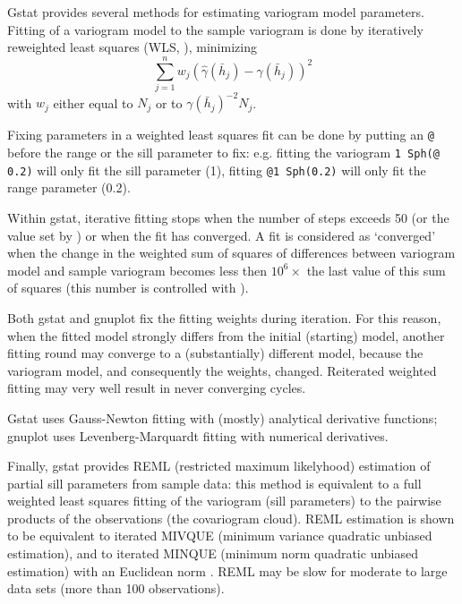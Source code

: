\documentclass[a4paper,12pt]{book}
\renewcommand{\cite}{\citet}
\newcommand{\code}[1]{\texttt{#1}}
\newcommand{\iskey}[1]{\htmlref{\code{{#1}}}{key:#1}}
\newcommand{\isXkey}[2]{\htmlref{\code{{#1}}}{key:#2}}
\begin{document}
Gstat provides several methods for estimating variogram model
parameters. Fitting of a variogram model to the sample variogram is
done by iteratively reweighted least squares (WLS, \cite{cressie93}),
minimizing
$$
\sum_{j=1}^{n} 
w_j ( \hat \gamma (\bar{h}_j ) - \gamma(\bar{h}_j))^2
$$
with $w_j$ either equal to $N_j$ or to $\gamma(\bar{h}_j)^{-2}N_j$.

Fixing parameters in a weighted least squares fit can be done by putting
an {\tt @} before the range or the sill parameter to fix: e.g. fitting the
variogram {\tt 1 Sph(@ 0.2)} will only fit the sill parameter (1),
fitting {\tt @1 Sph(0.2)} will only fit the range parameter (0.2).

Within gstat, iterative fitting stops when the number of steps exceeds
50 (or the value set by \iskey{iter}) or when the fit has converged. A
fit is considered as `converged' when the change in the weighted sum of
squares of differences between variogram model and sample variogram
becomes less then $10^6 \times$ the last value of this sum of squares
(this number is controlled with \isXkey{fit\_limit}{fitXlimit}).


Both gstat and gnuplot fix the fitting weights during iteration. For
this reason, when the fitted model strongly differs from the initial
(starting) model, another fitting round may converge to a (substantially)
different model, because the variogram model, and consequently the
weights, changed. Reiterated weighted fitting may very well result in
never converging cycles. 

Gstat uses Gauss-Newton fitting with (mostly) analytical derivative
functions; gnuplot uses Levenberg-Marquardt fitting with numerical
derivatives.

Finally, gstat provides REML (restricted maximum likelyhood) estimation of
partial sill parameters \cite{kitanidis85,christensen93} from sample data:
this method is equivalent to a full weighted least squares fitting of the
variogram (sill parameters) to the pairwise products of the observations
(the covariogram cloud). REML estimation is shown to be equivalent to
iterated MIVQUE (minimum variance quadratic unbiased estimation), and
to iterated MINQUE (minimum norm quadratic unbiased estimation) with an
Euclidean norm \cite{christensen93}. REML may be slow for moderate to
large data sets (more than 100 observations).
\end{document}
